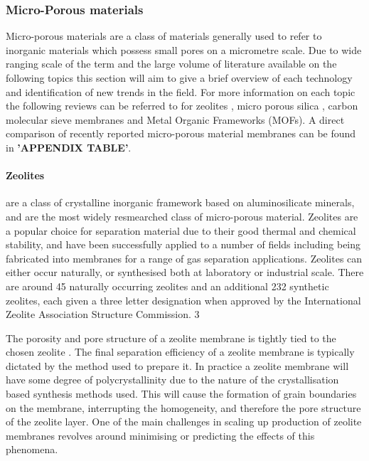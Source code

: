 \subsubsection{Micro-Porous materials}
Micro-porous materials are a class of materials generally used to refer to inorganic 
materials which possess small pores on a micrometre scale. Due to wide ranging scale of the 
term and the large volume of literature available on the following topics this section will 
aim to give a brief overview of each technology and identification of new trends in the field.
For more information on each topic the following reviews can be referred to for zeolites 
\cite{NathanW.Ockwig2007a, Li2015, Lin2001, Lin2013, Gascon2012, Rangnekar2015, Kosinov2016}, micro porous silica \cite{NathanW.Ockwig2007a, Li2015, Khatib2011}, carbon molecular sieve membranes\cite{NathanW.Ockwig2007a, Li2015, Khatib2011, He2017, Saufi2004, Salleh2011, He2017} and 
Metal Organic Frameworks (MOFs).\cite{Qiu2014, Long2009, Caro2011, Kang2017, Kim2018, Barea2014, Li2009, Stassen2017} A direct comparison of recently reported micro-porous 
material membranes can be found in \textbf{'APPENDIX TABLE'}.

\paragraph{Zeolites} are a class of crystalline inorganic framework based on aluminosilicate minerals, 
and are the most widely resmearched class of micro-porous material. Zeolites are a popular 
choice for separation material due to their good thermal and chemical stability, and have 
been successfully applied to a number of fields including being fabricated into membranes 
for a range of gas separation applications.\cite{NathanW.Ockwig2007a} Zeolites can either occur naturally, or 
synthesised both at laboratory or industrial scale. \cite{Rangnekar2015}  There are around 45 naturally 
occurring zeolites and an additional 232 synthetic zeolites, each given a three letter 
designation when approved by the International Zeolite Association Structure Commission. 3\cite{StructureCommissionoftheInternationalZeoliteAssociation}

The porosity and pore structure of a zeolite membrane is tightly tied to the chosen zeolite \cite{StructureCommissionoftheInternationalZeoliteAssociation}. 
The final separation efficiency of a zeolite membrane is typically dictated by the method 
used to prepare it. In practice a zeolite membrane will have some degree of polycrystallinity \cite{Kosinov2016} 
due to the nature of the crystallisation based synthesis methods used. 
This will cause the formation of grain boundaries on the membrane, interrupting the 
homogeneity, and therefore the pore structure of the zeolite layer. One of the main 
challenges in scaling up production of zeolite membranes revolves around minimising or 
predicting the effects of this phenomena. 


